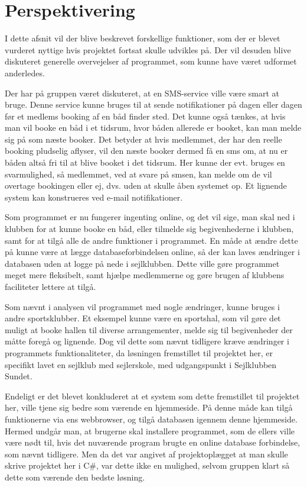 \chapter{Perspektivering}

\cbstart

I dette afsnit vil der blive beskrevet forskellige funktioner, som der er blevet vurderet nyttige hvis projektet fortsat
skulle udvikles på. Der vil desuden blive diskuteret generelle overvejelser af programmet, som kunne have været udformet
anderledes. 

Der har på gruppen været diskuteret, at en SMS-service ville være smart at bruge. Denne service kunne bruges til at sende
notifikationer på dagen eller dagen før et medlems booking af en båd finder sted. Det kunne også tænkes, at hvis man
vil booke en båd i et tidsrum, hvor båden allerede er booket, kan man melde sig på som næste booker. Det betyder at hvis
medlemmet, der har den reelle booking pludselig aflyser, vil den næste booker dermed få en sms om, at nu er båden altså
fri til at blive booket i det tidsrum. Her kunne der evt. bruges en svarmulighed, så medlemmet, ved at svare på smsen,
kan melde om de vil overtage bookingen eller ej, dvs. uden at skulle åben systemet op. Et lignende system kan
konstrueres ved e-mail notifikationer.

Som programmet er nu fungerer ingenting online, og det vil sige, man skal ned i klubben for at kunne booke en båd, eller
tilmelde sig begivenhederne i klubben, samt for at tilgå alle de andre funktioner i programmet. En måde at ændre dette på kunne være
at lægge databaseforbindelsen online, så der kan laves ændringer i databasen uden at logge på nede i sejlklubben. Dette
ville gøre programmet meget mere fleksibelt, samt hjælpe medlemmerne og gøre brugen af klubbens faciliteter lettere at
tilgå.

Som nævnt i analysen vil programmet med nogle ændringer, kunne bruges i andre sportsklubber. Et eksempel kunne være en
sportshal, som vil gøre det muligt at booke hallen til diverse arrangementer, melde sig til begivenheder der måtte foregå
og lignende. Dog vil dette som nævnt tidligere kræve ændringer i programmets funktionaliteter, da løsningen fremstillet
til projektet her, er specifikt lavet en sejlklub med sejlerskole, med udgangspunkt i Sejlklubben Sundet.

Endeligt er det blevet konkluderet at et system som dette fremstillet til projektet her, ville tjene sig bedre som
værende en hjemmeside. På denne måde kan tilgå funktionerne via ens webbrowser, og tilgå databasen igennem denne
hjemmeside. Hermed undgår man, at brugerne skal installere programmet, som de ellers ville være nødt til, hvis det
nuværende program brugte en online database forbindelse, som nævnt tidligere. Men da det var angivet af projektoplægget
at man skulle skrive projektet her i C\#, var dette ikke en mulighed, selvom gruppen klart så dette som værende den
bedste løsning.

\cbend